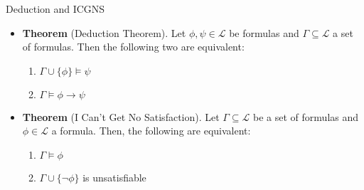 \begin{frame}{Deduction and ICGNS}

	\begin{itemize}
	
		\item \textbf{Theorem} (Deduction Theorem). Let $\phi,\psi\in\mathcal{L}$ be formulas and $\Gamma\subseteq\mathcal{L}$ a set of formulas. Then the following two are equivalent:
			\begin{enumerate}[1.]
			
				\item $\Gamma\cup\{\phi\}\vDash\psi$
				
				\item $\Gamma\vDash \phi\to\psi$
			
			\end{enumerate}


		\item \textbf{Theorem} (I Can't Get No Satisfaction).
			Let $\Gamma\subseteq\mathcal{L}$ be a set of formulas and $\phi\in\mathcal{L}$ a formula. Then, the following are equivalent:
			\begin{enumerate}[1.]
			
				\item $\Gamma\vDash\phi$
				
				\item $\Gamma\cup\{\neg\phi\}$ is unsatisfiable
			
			\end{enumerate}

	
	\end{itemize}

\end{frame}

